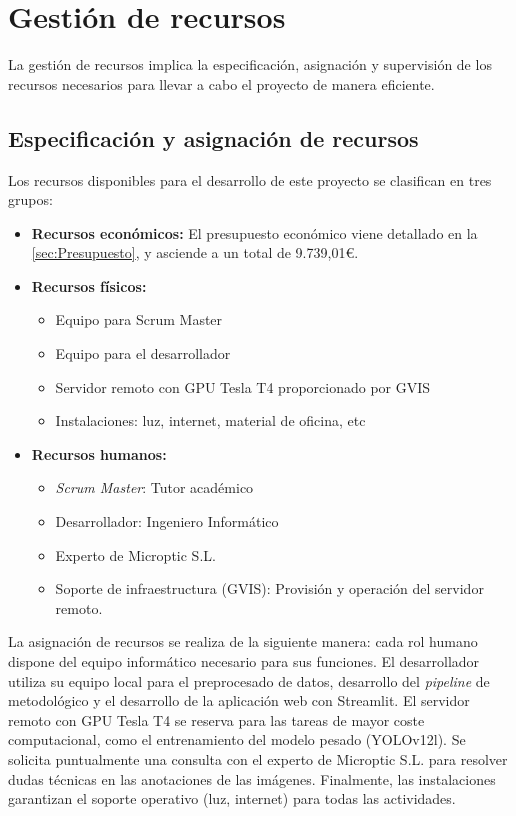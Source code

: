 \documentclass[12pt,a4paper,onecolumn,oneside]{report}
\begin{document}
\section{Gestión de recursos}
\label{Gestión de recursos}

La gestión de recursos implica la especificación, asignación y supervisión de los recursos necesarios para llevar a cabo el proyecto de manera eficiente.

\subsection{Especificación y asignación de recursos}
\label{Especificación y asignación de recursos}

Los recursos disponibles para el desarrollo de este proyecto se clasifican en tres grupos:

\begin{itemize}
  \item \textbf{Recursos económicos:} El presupuesto económico viene detallado en la \autoref{sec:Presupuesto}, y asciende a un total de 9.739,01\euro{}.
  \item \textbf{Recursos físicos:}
    \begin{itemize}[label=-]
      \item Equipo para Scrum Master
      \item Equipo para el desarrollador
      \item Servidor remoto con GPU Tesla T4 proporcionado por GVIS
      \item Instalaciones: luz, internet, material de oficina, etc
    \end{itemize}
  \item \textbf{Recursos humanos:} 
    \begin{itemize}[label=-]
      \item \textit{Scrum Master}: Tutor académico
      \item Desarrollador: Ingeniero Informático
      \item Experto de Microptic S.L.
      \item Soporte de infraestructura (GVIS): Provisión y operación del servidor remoto.
    \end{itemize}
\end{itemize}

La asignación de recursos se realiza de la siguiente manera: cada rol humano dispone del equipo informático necesario para sus 
funciones. El desarrollador utiliza su equipo local para el preprocesado de datos, desarrollo del \textit{pipeline} de metodológico y el desarrollo de la aplicación web con Streamlit. 
El servidor remoto con GPU Tesla T4 se reserva para las tareas de mayor coste computacional, como el entrenamiento del modelo pesado (YOLOv12l).
Se solicita puntualmente una consulta con el experto de Microptic S.L. para resolver dudas técnicas en las anotaciones de las imágenes.
Finalmente, las instalaciones garantizan el soporte operativo (luz, internet) para todas las actividades.
\end{document}
